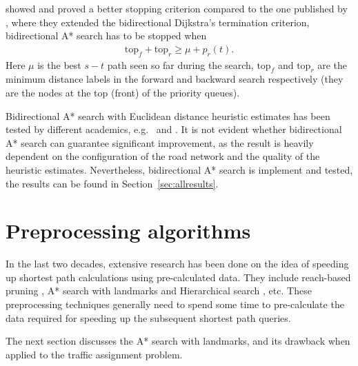 \citet{GoldbergEPP} showed and proved a better stopping criterion compared to the one published by \citet{Pohl},
where they extended the bidirectional Dijkstra's termination criterion,
bidirectional A* search has to be stopped when
\begin{align}
    \text{top}_f + \text{top}_r \geq \mu + p_r(t).
\end{align}
Here $\mu$ is the best $s-t$ path seen so far during the search,
$\text{top}_f$ and $\text{top}_r$ are the minimum distance labels in the forward and backward search respectively (they are the nodes at the top (front) of the priority queues).

Bidirectional A* search with Euclidean distance heuristic estimates has been tested by different academics, e.g.\ \citet{Klunder} and \citet{Goldberg05}.
It is not evident whether bidirectional A* search can guarantee significant improvement,
as the result is heavily dependent on the configuration of the road network and the quality of the heuristic estimates.
Nevertheless, bidirectional A* search is implement and tested, the results can be found in Section~\ref{sec:allresults}.

\section{Preprocessing algorithms}
In the last two decades,
extensive research has been done on the idea of speeding up shortest path calculations using pre-calculated data.
They include reach-based pruning \citep{Goldberg}, A* search with landmarks \citep{GoldbergLandmarks} and Hierarchical search \citep{Ertl1998, Pearson}, etc.
These preprocessing techniques generally need to spend some time to pre-calculate the data required for speeding up the subsequent shortest path queries.

The next section discusses the A* search with landmarks,
and its drawback when applied to the traffic assignment problem.

